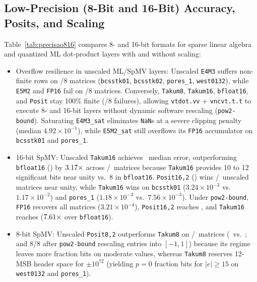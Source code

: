 \documentclass[conference]{IEEEtran}
\begin{document}
\subsection{Low-Precision (8-Bit and 16-Bit) Accuracy, Posits, and Scaling}
Table~\ref{tab:precisao816} compares 8- and 16-bit formats for sparse linear algebra and quantized ML dot-product layers with and without scaling:
\begin{itemize}
    \item Overflow resilience in unscaled ML/SpMV layers: Unscaled \texttt{E4M3} suffers non-finite rows on \NFEquatrom/8 matrices (\texttt{bcsstk01}, \texttt{bcsstk02}, \texttt{pores\_1}, \texttt{west0132}), while \texttt{E5M2} and \texttt{FP16} fail on \NFCincodois/8 matrices. Conversely, \texttt{Takum8}, \texttt{Takum16}, \texttt{bfloat16}, and \texttt{Posit} stay 100\% finite (\NFTakumOito/8 failures), allowing \texttt{vtdot.vv} + \texttt{vncvt.t.t} to execute 8- and 16-bit layers without dynamic software rescaling (\texttt{pow2-bound}). Saturating \texttt{E4M3\_sat} eliminates \texttt{NaN}s at a severe clipping penalty (median $4.92\times 10^{-1}$), while \texttt{E5M2\_sat} still overflows its \texttt{FP16} accumulator on \texttt{bcsstk01} and \texttt{pores\_1}.
    \item 16-bit SpMV: Unscaled \texttt{Takum16} achieves \MedTakumDez\ median error, outperforming \texttt{bfloat16} (\MedBF) by $3.17\times$ across \ParDezBFTakumVence/\ParDezBFAmbos\ matrices because \texttt{Takum16} provides 10 to 12 significant bits near unity vs.\ 8 in \texttt{bfloat16}. \texttt{Posit16,2} (\MedPositDez) wins \ParDezPositOutroVence/\ParDezPositAmbos\ unscaled matrices near unity, while \texttt{Takum16} wins on \texttt{bcsstk01} ($3.24\times 10^{-3}$ vs.\ $1.17\times 10^{-2}$) and \texttt{pores\_1} ($1.18\times 10^{-3}$ vs.\ $7.56\times 10^{-3}$). Under \texttt{pow2-bound}, \texttt{FP16} recovers all matrices ($3.21\times 10^{-4}$), \texttt{Posit16,2} reaches \MedPositDezScaled, and \texttt{Takum16} reaches \MedTakumDezScaled ($7.61\times$ over \texttt{bfloat16}).
    \item 8-bit SpMV: Unscaled \texttt{Posit8,2} outperforms \texttt{Takum8} on \ParOitoPositOutroVence/\ParOitoPositAmbos\ matrices (\MedPositOito\ vs.\ \MedTakumOito; and 8/8 after \texttt{pow2-bound} rescaling entries into $[-1,1]$) because its regime leaves more fraction bits on moderate values, whereas \texttt{Takum8} reserves 12-MSB header space for $\pm 10^{72}$ (yielding $p=0$ fraction bits for $|e|\ge 15$ on \texttt{west0132} and \texttt{pores\_1}).
\end{itemize}
\end{document}
